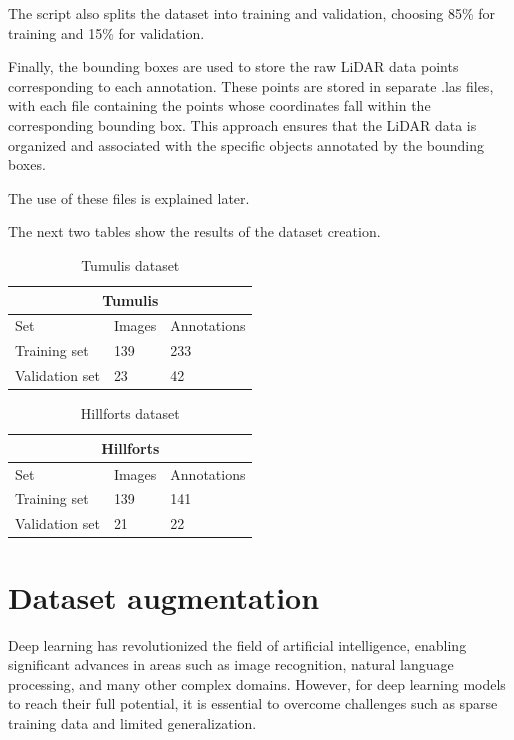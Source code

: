 The script also splits the dataset into training and validation, choosing 85\% for training and 15\% for validation.

Finally, the bounding boxes are used to store the raw LiDAR data points corresponding to each annotation. These points are stored in separate .las files, with each file containing the points whose coordinates fall within the corresponding bounding box. This approach ensures that the LiDAR data is organized and associated with the specific objects annotated by the bounding boxes.

The use of these files is explained later.

The next two tables show the results of the dataset creation.

\begin{table}[H]
\centering
\begin{tabular}{|p{3cm}|p{2.5cm}|p{2cm}|} 
\hline
\multicolumn{3}{|c|}{Tumulis} \\
 \hline
  Set & Images & Annotations\\ [0.5ex] 
 \hline
 Training set & 139 & 233 \\ 
 Validation set & 23 & 42  \\[1ex]
 \hline
\end{tabular}
\caption{Tumulis dataset}
\end{table} 

\begin{table}[H]
\centering
\begin{tabular}{|p{3cm}|p{2.5cm}|p{2cm}|} 
\hline
\multicolumn{3}{|c|}{Hillforts} \\
 \hline
  Set & Images & Annotations\\ [0.5ex] 
 \hline
 Training set & 139 & 141 \\ 
 Validation set & 21 & 22  \\[1ex]
 \hline
\end{tabular}
\caption{Hillforts dataset}
\end{table} 


\section{Dataset augmentation}
Deep learning has revolutionized the field of artificial intelligence, enabling significant advances in areas such as image recognition, natural language processing, and many other complex domains. However, for deep learning models to reach their full potential, it is essential to overcome challenges such as sparse training data and limited generalization.

